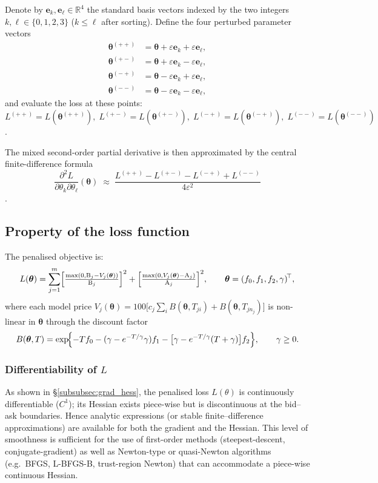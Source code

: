 \documentclass[12pt]{article}
\begin{document}
Denote by \(\mathbf e_k,\mathbf e_\ell\in\mathbb R^{4}\) the standard basis vectors indexed by the two integers \(k,\ell\in\{0,1,2,3\}\) (\(k\le\ell\) after sorting).  
Define the four perturbed parameter vectors
\[
\begin{aligned}
\boldsymbol{\theta}^{(++)}&=\boldsymbol{\theta}+\varepsilon\mathbf e_k+\varepsilon\mathbf e_\ell,\\
\boldsymbol{\theta}^{(+-)}&=\boldsymbol{\theta}+\varepsilon\mathbf e_k-\varepsilon\mathbf e_\ell,\\
\boldsymbol{\theta}^{(-+)}&=\boldsymbol{\theta}-\varepsilon\mathbf e_k+\varepsilon\mathbf e_\ell,\\
\boldsymbol{\theta}^{(--)}&=\boldsymbol{\theta}-\varepsilon\mathbf e_k-\varepsilon\mathbf e_\ell,
\end{aligned}
\]
and evaluate the loss at these points:
\(L^{(++)}=L(\boldsymbol{\theta}^{(++)}),\;
  L^{(+-)}=L(\boldsymbol{\theta}^{(+-)}),\;
  L^{(-+)}=L(\boldsymbol{\theta}^{(-+)}),\;
  L^{(--)}=L(\boldsymbol{\theta}^{(--)})\).
  
The mixed second-order partial derivative is then approximated by the central finite-difference formula
\[
\frac{\partial^{2}L}{\partial\theta_k\partial\theta_\ell}(\boldsymbol{\theta})
\;\approx\;
\frac{L^{(++)}-L^{(+-)}-L^{(-+)}+L^{(--)}}{4\varepsilon^{2}}
\].

\subsection{Property of the loss function}
\label{sec:property}
The penalised objective is:
\[
L(\boldsymbol{\theta})
=\sum_{j=1}^{m}
  \Bigl[\tfrac{\max(0,\text{B}_{j}-V_{j}(\boldsymbol{\theta}))}
              {\text{B}_{j}}\Bigr]^{2}
 +\Bigl[\tfrac{\max(0,V_{j}(\boldsymbol{\theta})-\text{A}_{j})}
              {\text{A}_{j}}\Bigr]^{2},
\qquad 
\boldsymbol{\theta}=(f_0,f_1,f_2,\gamma)^{\!\top},
\]
where each model price  \(V_{j}(\boldsymbol{\theta})=100\bigl[c_j\sum_{i}B(\boldsymbol{\theta},T_{ji})
                               +B(\boldsymbol{\theta},T_{jn_j})\bigr]\) is non-linear in \(\boldsymbol{\theta}\) through the discount factor
\[
B(\boldsymbol{\theta},T)=
\exp\!\Bigl\{-Tf_0-(\gamma-e^{-T/\gamma}\gamma)f_1 -
          \bigl[\gamma-e^{-T/\gamma}(T+\gamma)\bigr]f_2\Bigr\},
\qquad \gamma\geq0.
\]

\subsubsection{Differentiability of \(L\)}
As shown in \S\ref{subsubsec:grad_hess}, the penalised loss \(L(\theta)\) is continuously differentiable (\(C^{1}\)); its Hessian exists piece-wise but is discontinuous at the bid–ask boundaries.  Hence analytic expressions (or stable finite–difference approximations) are available for both the gradient and the Hessian.  This level of smoothness is sufficient for the use of first-order methods (steepest-descent, conjugate-gradient) as well as Newton-type or quasi-Newton algorithms (e.g.\ BFGS, L-BFGS-B, trust-region Newton) that can accommodate a piece-wise continuous Hessian.
\end{document}
